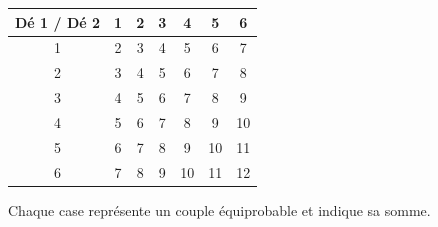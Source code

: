 \begin{center}\renewcommand{\arraystretch}{1.35}\begin{tabular}{c|cccccc}\toprule
Dé 1 / Dé 2 & 1 & 2 & 3 & 4 & 5 & 6\\\midrule
1 & 2 & 3 & 4 & 5 & 6 & 7\\
2 & 3 & 4 & 5 & 6 & 7 & 8\\
3 & 4 & 5 & 6 & 7 & 8 & 9\\
4 & 5 & 6 & 7 & 8 & 9 & 10\\
5 & 6 & 7 & 8 & 9 & 10 & 11\\
6 & 7 & 8 & 9 & 10 & 11 & 12\\
\bottomrule\end{tabular}\end{center}
{\par\smallskip\fontsize{8}{10}\selectfont\color{otMuted}Chaque case représente un couple équiprobable et indique sa somme.\par}
